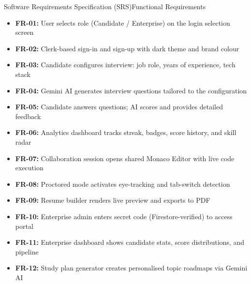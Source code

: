 \documentclass{beamer}
\begin{document}
\begin{frame}{Software Requirements Specification (SRS)}{Functional Requirements}
\small
\begin{itemize}
    \item \textbf{FR-01:} User selects role (Candidate / Enterprise) on the login selection screen

    \item \textbf{FR-02:} Clerk-based sign-in and sign-up with dark theme and brand colour

    \item \textbf{FR-03:} Candidate configures interview: job role, years of experience, tech stack

    \item \textbf{FR-04:} Gemini AI generates interview questions tailored to the configuration

    \item \textbf{FR-05:} Candidate answers questions; AI scores and provides detailed feedback

    \item \textbf{FR-06:} Analytics dashboard tracks streak, badges, score history, and skill radar

    \item \textbf{FR-07:} Collaboration session opens shared Monaco Editor with live code execution

    \item \textbf{FR-08:} Proctored mode activates eye-tracking and tab-switch detection

    \item \textbf{FR-09:} Resume builder renders live preview and exports to PDF

    \item \textbf{FR-10:} Enterprise admin enters secret code (Firestore-verified) to access portal

    \item \textbf{FR-11:} Enterprise dashboard shows candidate stats, score distributions, and pipeline

    \item \textbf{FR-12:} Study plan generator creates personalised topic roadmaps via Gemini AI
\end{itemize}
\end{frame}
\end{document}
